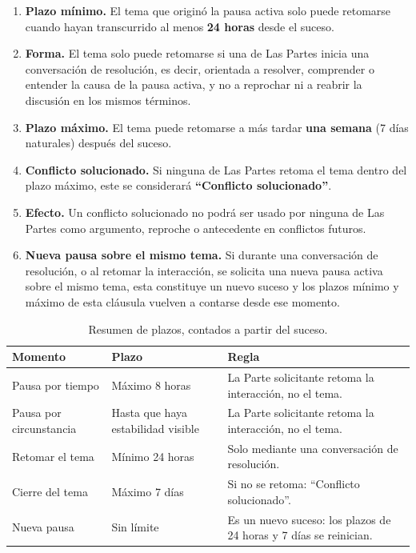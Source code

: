 \begin{enumerate}[label=\arabic*., leftmargin=*, itemsep=0.3em]
  \item \textbf{Plazo mínimo.} El tema que originó la pausa activa solo puede retomarse cuando hayan transcurrido al menos \textbf{24 horas} desde el suceso.

  \item \textbf{Forma.} El tema solo puede retomarse si una de Las Partes inicia una conversación de resolución, es decir, orientada a resolver, comprender o entender la causa de la pausa activa, y no a reprochar ni a reabrir la discusión en los mismos términos.

  \item \textbf{Plazo máximo.} El tema puede retomarse a más tardar \textbf{una semana} (7 días naturales) después del suceso.

  \item \textbf{Conflicto solucionado.} Si ninguna de Las Partes retoma el tema dentro del plazo máximo, este se considerará \textbf{\enquote{Conflicto solucionado}}.

  \item \textbf{Efecto.} Un conflicto solucionado no podrá ser usado por ninguna de Las Partes como argumento, reproche o antecedente en conflictos futuros.

  \item \textbf{Nueva pausa sobre el mismo tema.} Si durante una conversación de resolución, o al retomar la interacción, se solicita una nueva pausa activa sobre el mismo tema, esta constituye un nuevo suceso y los plazos mínimo y máximo de esta cláusula vuelven a contarse desde ese momento.
\end{enumerate}

\begin{table}[H]
  \centering
  \small
  \begin{tabularx}{\textwidth}{@{} l >{\raggedright\arraybackslash}p{3.4cm} X @{}}
    \toprule
    \textbf{Momento}         & \textbf{Plazo}        & \textbf{Regla} \\
    \midrule
    Pausa por tiempo         & Máximo 8 horas        & La Parte solicitante retoma la interacción, no el tema. \\
    Pausa por circunstancia  & Hasta que haya estabilidad visible & La Parte solicitante retoma la interacción, no el tema. \\
    Retomar el tema          & Mínimo 24 horas       & Solo mediante una conversación de resolución. \\
    Cierre del tema          & Máximo 7 días         & Si no se retoma: \enquote{Conflicto solucionado}. \\
    Nueva pausa              & Sin límite            & Es un nuevo suceso: los plazos de 24 horas y 7 días se reinician. \\
    \bottomrule
  \end{tabularx}
  \caption{Resumen de plazos, contados a partir del suceso.}
  \label{tab:plazos}
\end{table}

